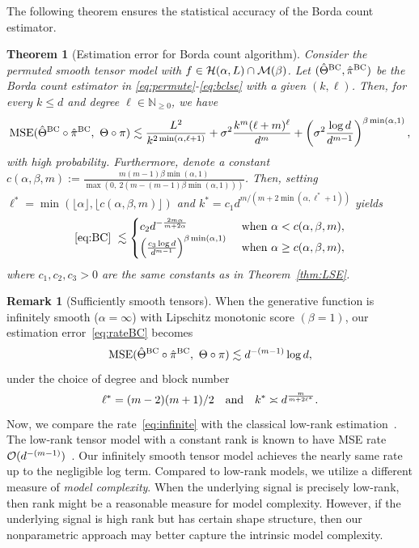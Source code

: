 \documentclass[11pt]{article}
\newtheorem{thm}{Theorem}
\theoremstyle{definition}
\newtheorem{rmk}{Remark}
\begin{document}
The following theorem ensures the statistical accuracy of the Borda count estimator.
\begin{thm}[Estimation error for Borda count algorithm]\label{thm:BC} Consider the permuted smooth tensor model with $f\in \mathcal{H}(\alpha,L)\cap \mathcal{M}(\beta)$.
Let $(\hat\Theta^{\textup{BC}},\hat\pi^{\textup{BC}})$ be the Borda count estimator in \eqref{eq:permute}-\eqref{eq:bclse} with a given $(k,\ell)$. Then, for every $k\leq d$ and degree $\ell\in \mathbb{N}_{\geq 0}$, we have
\begin{align}\label{eq:BC}
     \textup{MSE}(\hat\Theta^{\textup{BC}}\circ\hat\pi^{\textup{BC}},\ \Theta\circ\pi)\lesssim  \frac{L^2}{k^{2\min(\alpha,\ell+1)}}+\sigma^2 \frac{k^m(\ell+m)^\ell}{d^m}+ \left(\sigma^2{\log d\over d^{m-1}}\right)^{\beta\min(\alpha,1)},
\end{align}
with high probability. Furthermore, denote a constant $c(\alpha,\beta,m):= \frac{m(m-1)\beta\min(\alpha,1)}{\max(0,\ 2(m-(m-1)\beta\min(\alpha,1)))}$. Then, setting {\footnotesize $
\ell^* = \min\left(\lfloor\alpha\rfloor,\lfloor c(\alpha,\beta,m)\rfloor\right)$} and $k^* = c_1d^{m/ (m+2\min(\alpha,\ell^*+1))}$ yields
\begin{align}\label{eq:rateBC}
  \eqref{eq:BC}\  \lesssim  
   \begin{cases}
   c_2 d^{-{2m\alpha\over m+2\alpha}} & \text{ when } \alpha <c(\alpha,\beta,m),\\
   \left({c_3\log d\over d^{m-1}}\right)^{\beta\min(\alpha,1)}&\text{ when } \alpha \geq c(\alpha,\beta,m),
   \end{cases}
\end{align}
where $c_1,c_2,c_3>0$ are the same constants as in Theorem~\ref{thm:LSE}.
\end{thm}


\begin{rmk}[Sufficiently smooth tensors] When the generative function is infinitely smooth ($\alpha =\infty$) with Lipschitz monotonic score $(\beta=1)$,
our estimation error~\eqref{eq:rateBC} becomes
\begin{equation}\label{eq:infinite}
\textup{MSE}(\hat\Theta^{\textup{BC}}\circ\hat\pi^{\textup{BC}},\ \Theta\circ\pi)\lesssim d^{-(m-1)}\log d,
\end{equation}
under the choice of degree and block number
\[
\ell^*= {(m-2)(m+1)/2}\quad \text{and}\quad k^* \asymp d^{m\over m +2\ell^*}.
\]
Now, we compare the rate~\eqref{eq:infinite} with the classical low-rank estimation~\citep{wang2018learning,zhang2018tensor,kolda2009tensor}. The low-rank tensor model with a constant rank is known to have MSE rate $\mathcal{O}(d^{-(m-1)})$~\citep{wang2018learning}. Our infinitely smooth tensor model achieves the nearly same rate up to the negligible log term. Compared to low-rank models, we utilize a different measure of \emph{model complexity}.
When the underlying signal is precisely low-rank, then rank might be a reasonable measure for model complexity. However, if the underlying signal is high rank but has certain shape structure, then our nonparametric approach may better capture the intrinsic model complexity. 
\end{rmk}
\end{document}
